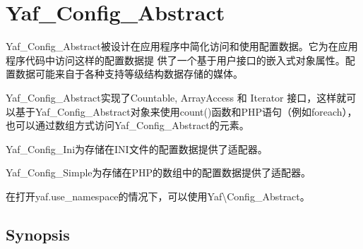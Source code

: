 \begin{lstlisting}[language=PHP]

\end{lstlisting}




\begin{lstlisting}[language=PHP]

\end{lstlisting}



\begin{lstlisting}[language=PHP]

\end{lstlisting}



\begin{lstlisting}[language=PHP]

\end{lstlisting}





\chapter{Yaf\_Config\_Abstract}


Yaf\_Config\_Abstract被设计在应用程序中简化访问和使用配置数据。它为在应用程序代码中访问这样的配置数据提 供了一个基于用户接口的嵌入式对象属性。配置数据可能来自于各种支持等级结构数据存储的媒体。

Yaf\_Config\_Abstract实现了Countable, ArrayAccess 和 Iterator 接口，这样就可以基于Yaf\_Config\_Abstract对象来使用count()函数和PHP语句（例如foreach），也可以通过数组方式访问Yaf\_Config\_Abstract的元素。


\begin{compactitem}
\item Yaf\_Config\_Ini为存储在INI文件的配置数据提供了适配器。

\item Yaf\_Config\_Simple为存储在PHP的数组中的配置数据提供了适配器。

\end{compactitem}

在打开yaf.use\_namespace的情况下，可以使用Yaf\textbackslash Config\_Abstract。



\section{Synopsis}



